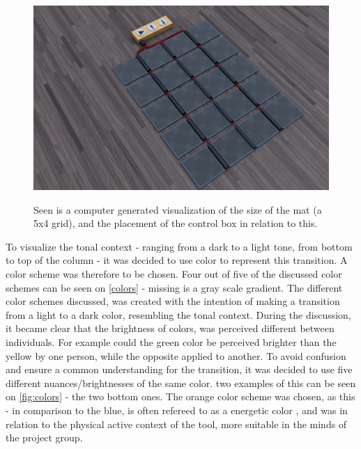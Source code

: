 \begin{figure}[H]
	\centering
	\includegraphics[width=0.8\linewidth]{figure/Design/finaldesign}
	\label{fig:matSize}
	\caption{Seen is a computer generated visualization of the size of the mat (a 5x4 grid), and the placement of the control box in relation to this.}
\end{figure}

To visualize the tonal context - ranging from a dark to a light tone, from bottom to top of the column - it was decided to use color to represent this transition. A color scheme was therefore to be chosen. Four out of five of the discussed color schemes can be seen on \autoref{colors} - missing is a gray scale gradient. The different color schemes discussed, was created with the intention of making a transition from a light to a dark color, resembling the tonal context. During the discussion, it became clear that the brightness of colors, was perceived different between individuals. For example could the green color be perceived brighter than the yellow by one person, while the opposite applied to another. To avoid confusion and ensure a common understanding for the transition, it was decided to use five different nuances/brightnesses of the same color. two examples of this can be seen on \autoref{fig:colors}  - the two bottom ones. The orange color scheme was chosen, as this - in comparison to the blue, is often refereed to as a energetic color \cite{orange}, and was in relation to the physical active context of the tool, more suitable in the minds of the project group.               

